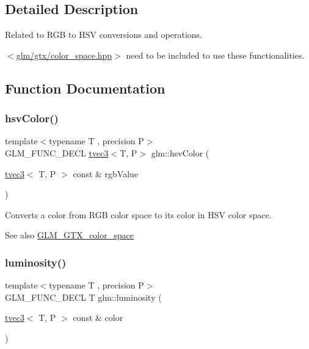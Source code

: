 \subsection{Detailed Description}
Related to R\+GB to H\+SV conversions and operations. 

$<$\hyperlink{gtx_2color__space_8hpp}{glm/gtx/color\+\_\+space.\+hpp}$>$ need to be included to use these functionalities. 

\subsection{Function Documentation}
\mbox{\label{group__gtx__color__space_gae72039c00a7be2f03a3b94b37a54349a}} 
\subsubsection{\texorpdfstring{hsv\+Color()}{hsvColor()}}
{\footnotesize\ttfamily template$<$typename T , precision P$>$ \\
G\+L\+M\+\_\+\+F\+U\+N\+C\+\_\+\+D\+E\+CL \hyperlink{structglm_1_1tvec3}{tvec3}$<$T, P$>$ glm\+::hsv\+Color (\begin{DoxyParamCaption}\item[{\hyperlink{structglm_1_1tvec3}{tvec3}$<$ T, P $>$ const \&}]{rgb\+Value }\end{DoxyParamCaption})}

Converts a color from R\+GB color space to its color in H\+SV color space. \begin{DoxySeeAlso}{See also}
\hyperlink{group__gtx__color__space}{G\+L\+M\+\_\+\+G\+T\+X\+\_\+color\+\_\+space} 
\end{DoxySeeAlso}
\mbox{\label{group__gtx__color__space_gaa2f38a5100c3e1c7d39920df43bd8cbe}} 
\subsubsection{\texorpdfstring{luminosity()}{luminosity()}}
{\footnotesize\ttfamily template$<$typename T , precision P$>$ \\
G\+L\+M\+\_\+\+F\+U\+N\+C\+\_\+\+D\+E\+CL T glm\+::luminosity (\begin{DoxyParamCaption}\item[{\hyperlink{structglm_1_1tvec3}{tvec3}$<$ T, P $>$ const \&}]{color }\end{DoxyParamCaption})}

